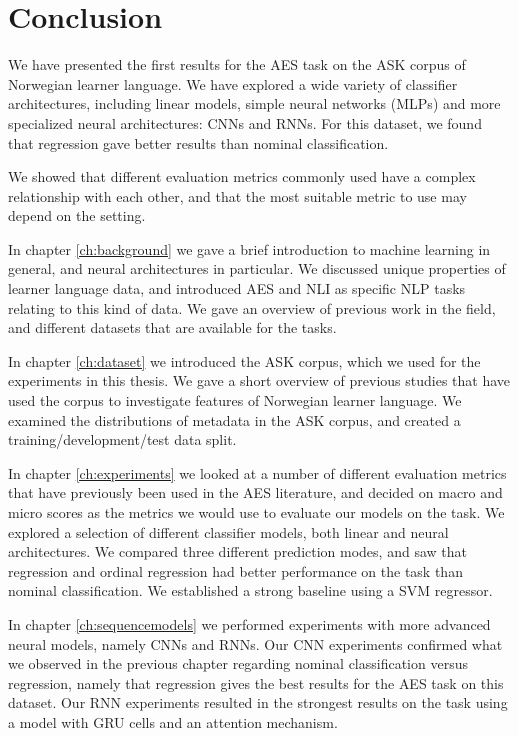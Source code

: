 \chapter{Conclusion} \label{ch:conclusion}

We have presented the first results for the \ac{AES} task on the ASK corpus
of Norwegian learner language. We have explored a wide variety of classifier
architectures, including linear models, simple neural networks (\acp{MLP})
and more specialized neural architectures: \acp{CNN} and \acp{RNN}. For this
dataset, we found that regression gave better results than nominal
classification.

We showed that different evaluation metrics commonly used have a complex
relationship with each other, and that the most suitable metric to use may
depend on the setting.

In chapter \ref{ch:background} we gave a brief introduction to machine
learning in general, and neural architectures in particular. We discussed
unique properties of learner language data, and introduced \ac{AES} and
\ac{NLI} as specific \ac{NLP} tasks relating to this kind of data. We gave an
overview of previous work in the field, and different datasets that are
available for the tasks.

In chapter \ref{ch:dataset} we introduced the ASK corpus, which we used for
the experiments in this thesis. We gave a short overview of previous studies
that have used the corpus to investigate features of Norwegian learner
language. We examined the distributions of metadata in the ASK corpus, and
created a training/development/test data split.

In chapter \ref{ch:experiments} we looked at a number of different evaluation
metrics that have previously been used in the \ac{AES} literature, and
decided on macro and micro \FI scores as the metrics we would use to evaluate
our models on the task. We explored a selection of different classifier
models, both linear and neural architectures. We compared three different
prediction modes, and saw that regression and ordinal regression had better
performance on the task than nominal classification. We established a strong
baseline using a \ac{SVM} regressor.

In chapter \ref{ch:sequencemodels} we performed experiments with more
advanced neural models, namely \acp{CNN} and \acp{RNN}. Our CNN experiments
confirmed what we observed in the previous chapter regarding nominal
classification versus regression, namely that regression gives the best
results for the \ac{AES} task on this dataset. Our \ac{RNN} experiments
resulted in the strongest results on the task using a model with GRU cells
and an attention mechanism.

